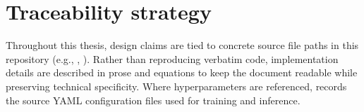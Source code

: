 \section{Traceability strategy}
\label{sec:traceability}
Throughout this thesis, design claims are tied to concrete source file paths in this repository (e.g., , ). Rather than reproducing verbatim code, implementation details are described in prose and equations to keep the document readable while preserving technical specificity. Where hyperparameters are referenced,  records the source YAML configuration files used for training and inference.
